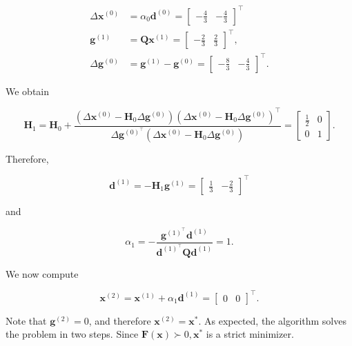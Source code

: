 \[
	\begin{aligned}
		\Delta \boldsymbol{x}^{(0)} & =\alpha_{0} \boldsymbol{d}^{(0)}=\left[\begin{array}{ll}
			-\frac{4}{3} & -\frac{4}{3}
		\end{array}\right]^{\top} \\
		\boldsymbol{g}^{(1)} & = \boldsymbol{Q} \boldsymbol{x}^{(1)}=\left[\begin{array}{ll}
			-\frac{2}{3} & \frac{2}{3}
		\end{array}\right]^{\top}, \\
		\Delta \boldsymbol{g}^{(0)} & =\boldsymbol{g}^{(1)}-\boldsymbol{g}^{(0)}=\left[\begin{array}{ll}
			-\frac{8}{3} & -\frac{4}{3}
		\end{array}\right]^{\top} .
	\end{aligned}
\]

We obtain

\[
	\boldsymbol{H}_{1}=\boldsymbol{H}_{0}+\frac{\left(\Delta \boldsymbol{x}^{(0)}-\boldsymbol{H}_{0} \Delta \boldsymbol{g}^{(0)}\right)\left(\Delta \boldsymbol{x}^{(0)}-\boldsymbol{H}_{0} \Delta \boldsymbol{g}^{(0)}\right)^{\top}}{\Delta \boldsymbol{g}^{(0)^{\top}}\left(\Delta \boldsymbol{x}^{(0)}-\boldsymbol{H}_{0} \Delta \boldsymbol{g}^{(0)}\right)}=\left[\begin{array}{cc}
		\frac{1}{2} & 0 \\
		0 & 1
	\end{array}\right] .
\]

Therefore,

\[
	\boldsymbol{d}^{(1)}=-\boldsymbol{H}_{1} \boldsymbol{g}^{(1)}=\left[\begin{array}{cc}
		\frac{1}{3} & -\frac{2}{3}
	\end{array}\right]^{\top}
\]

and

\[
	\alpha_{1}=-\frac{\boldsymbol{g}^{(1)^{\top}} \boldsymbol{d}^{(1)}}{\boldsymbol{d}^{(1)^{\top}} \boldsymbol{Q} \boldsymbol{d}^{(1)}}=1 .
\]

We now compute

\[
	\boldsymbol{x}^{(2)}=\boldsymbol{x}^{(1)}+\alpha_{1} \boldsymbol{d}^{(1)}=\left[\begin{array}{ll}
		0 & 0
	\end{array}\right]^{\top} .
\]

Note that \(\boldsymbol{g}^{(2)}=0\), and therefore \(\boldsymbol{x}^{(2)}=\boldsymbol{x}^{*}\). As expected, the algorithm solves the problem in two steps. Since \(\boldsymbol{F}(\boldsymbol{x}) \succ 0, \boldsymbol{x}^{*}\) is a strict minimizer.


